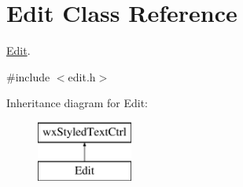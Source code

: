 \hypertarget{class_edit}{\section{Edit Class Reference}
\label{class_edit}
}


\hyperlink{class_edit}{Edit}.  




{\ttfamily \#include $<$edit.\+h$>$}

Inheritance diagram for Edit\+:\begin{figure}[H]
\begin{center}
\leavevmode
\includegraphics[height=2.000000cm]{class_edit}
\end{center}
\end{figure}
